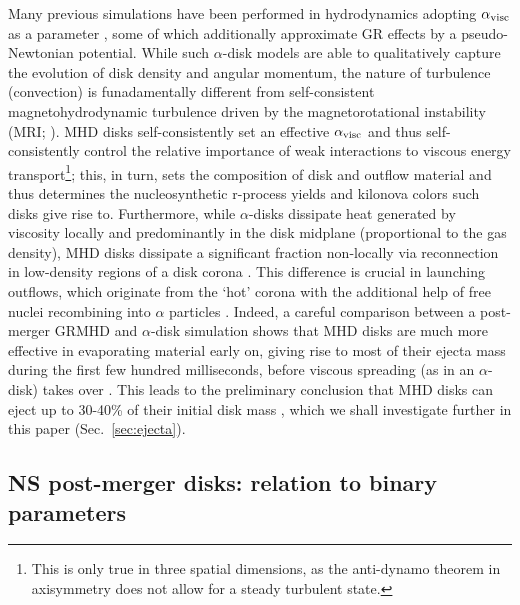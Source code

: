 Many previous simulations have been performed in hydrodynamics adopting $\alpha_{\rm visc}$ as a parameter \cite{fernandez_delayed_2013,fernandez_outflows_2015,just_comprehensive_2015,fujibayashi_properties_2017,fujibayashi_mass_2020}, some of which additionally approximate GR effects by a pseudo-Newtonian potential. While such $\alpha$-disk models are able to qualitatively capture the evolution of disk density and angular momentum, the nature of turbulence (convection) is funadamentally different from self-consistent magnetohydrodynamic turbulence driven by the magnetorotational instability (MRI; \cite{hawley_powerful_1992,balbus_nature_2002}). MHD disks self-consistently set an effective  $\alpha_{\rm visc}$ and thus self-consistently control the relative importance of weak interactions to viscous energy transport\footnote{This is only true in three spatial dimensions, as the anti-dynamo theorem in axisymmetry \cite{cowling_magnetic_1933} does not allow for a steady turbulent state.}; this, in turn, sets the composition of disk and outflow material and thus determines the nucleosynthetic r-process yields and kilonova colors such disks give rise to. Furthermore, while $\alpha$-disks dissipate heat generated by viscosity locally and predominantly in the disk midplane (proportional to the gas density), MHD disks dissipate a significant fraction non-locally via reconnection in low-density regions of a disk corona \cite{jiang_global_2014,siegel_three-dimensional_2018}. This difference is crucial in launching outflows, which originate from the `hot' corona with the additional help of free nuclei recombining into $\alpha$ particles \cite{siegel_three-dimensional_2018}. Indeed, a careful comparison between a post-merger GRMHD and $\alpha$-disk simulation shows that MHD disks are much more effective in evaporating material early on, giving rise to most of their ejecta mass during the first few hundred milliseconds, before viscous spreading (as in an $\alpha$-disk) takes over \cite{fernandez_long-term_2019}. This leads to the preliminary conclusion that MHD disks can eject up to 30-40\% of their initial disk mass \cite{siegel_three-dimensional_2018,fernandez_long-term_2019}, which we shall investigate further in this paper (Sec.~\ref{sec:ejecta}).

\subsection{NS post-merger disks: relation to binary parameters}\label{sec:param_space}

